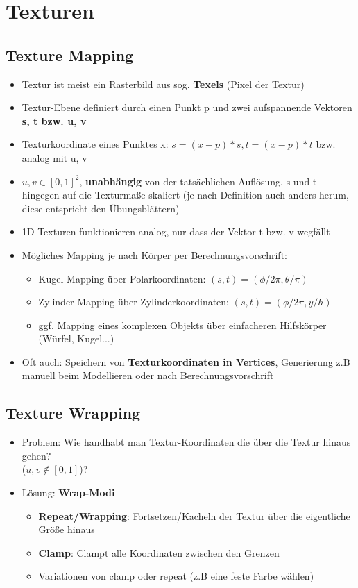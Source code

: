\section{Texturen}%
\label{tex:sec:texturen}

\subsection{Texture Mapping}%
\label{tex:sub:texture_mapping}

\begin{itemize}
	\item Textur ist meist ein Rasterbild aus sog. \textbf{Texels} (Pixel der Textur)
	\item Textur-Ebene definiert durch einen Punkt p und zwei aufspannende Vektoren \textbf{s, t bzw. u, v}
	\item Texturkoordinate eines Punktes x: $s = (x - p) * s, t = (x - p) * t$ bzw. analog mit u, v
	\item $u, v \in [0, 1]^2$, \textbf{unabhängig} von der tatsächlichen Auflösung, s und t hingegen auf die Texturmaße skaliert (je nach Definition auch anders herum, diese entspricht den Übungsblättern)
	\item 1D Texturen funktionieren analog, nur dass der Vektor t bzw. v wegfällt
	\item Mögliches Mapping je nach Körper per Berechnungsvorschrift:
	\begin{itemize}
		\item Kugel-Mapping über Polarkoordinaten: $(s, t) = (\phi / 2 \pi, \theta / \pi)$
		\item Zylinder-Mapping über Zylinderkoordinaten: $(s, t) = (\phi / 2 \pi, y / h)$
		\item ggf. Mapping eines komplexen Objekts über einfacheren Hilfskörper (Würfel, Kugel...)
	\end{itemize}
	\item Oft auch: Speichern von \textbf{Texturkoordinaten in Vertices}, Generierung z.B manuell beim Modellieren oder nach Berechnungsvorschrift
\end{itemize}

\subsection{Texture Wrapping}%
\label{tex:sub:texture_wrapping}

\begin{itemize}
	\item Problem: Wie handhabt man Textur-Koordinaten die über die Textur hinaus gehen?\\($u, v \notin [0, 1]$)?
	\item Lösung: \textbf{Wrap-Modi}
	\begin{itemize}
		\item \textbf{Repeat/Wrapping}: Fortsetzen/Kacheln der Textur über die eigentliche Größe hinaus
		\item \textbf{Clamp}: Clampt alle Koordinaten zwischen den Grenzen
		\item Variationen von clamp oder repeat (z.B eine feste Farbe wählen)
	\end{itemize}
\end{itemize}

